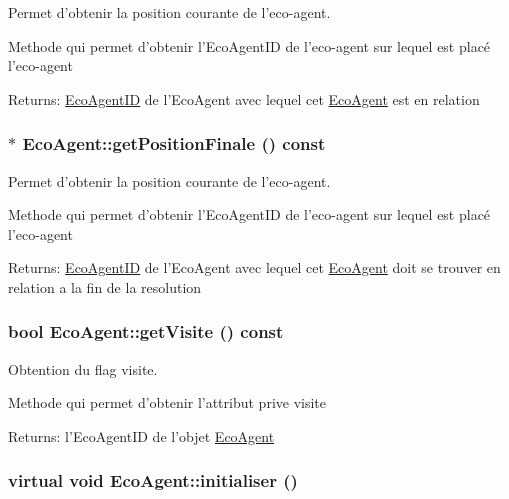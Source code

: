 Permet d'obtenir la position courante de l'eco-agent. 

Methode qui permet d'obtenir l'EcoAgentID de l'eco-agent sur lequel est placé l'eco-agent

\begin{Desc}
\item[Returns:]\hyperlink{classEcoAgentID}{EcoAgentID} de l'EcoAgent avec lequel cet \hyperlink{classEcoAgent}{EcoAgent} est en relation \end{Desc}
\hypertarget{classEcoAgent_2b5ca918f5ca154c8109022f364c275d}{
\subsubsection[{getPositionFinale}]{ $\ast$ EcoAgent::getPositionFinale () const}}
\label{classEcoAgent_2b5ca918f5ca154c8109022f364c275d}


Permet d'obtenir la position courante de l'eco-agent. 

Methode qui permet d'obtenir l'EcoAgentID de l'eco-agent sur lequel est placé l'eco-agent

\begin{Desc}
\item[Returns:]\hyperlink{classEcoAgentID}{EcoAgentID} de l'EcoAgent avec lequel cet \hyperlink{classEcoAgent}{EcoAgent} doit se trouver en relation a la fin de la resolution \end{Desc}
\hypertarget{classEcoAgent_8156bc22f2daca635c4f2577e6b96849}{
\subsubsection[{getVisite}]{\setlength{\rightskip}{0pt plus 5cm}bool EcoAgent::getVisite () const}}
\label{classEcoAgent_8156bc22f2daca635c4f2577e6b96849}


Obtention du flag visite. 

Methode qui permet d'obtenir l'attribut prive visite

\begin{Desc}
\item[Returns:]l'EcoAgentID de l'objet \hyperlink{classEcoAgent}{EcoAgent} \end{Desc}
\hypertarget{classEcoAgent_f779fd214bed010d0f6b7b137fde7116}{
\subsubsection[{initialiser}]{\setlength{\rightskip}{0pt plus 5cm}virtual void EcoAgent::initialiser ()}}
\label{classEcoAgent_f779fd214bed010d0f6b7b137fde7116}


